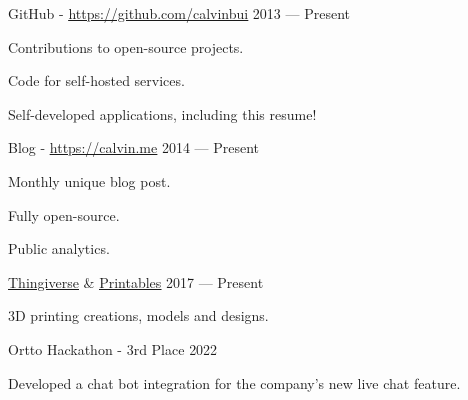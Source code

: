 
\begin{extracurricular}

  \ecitem
  {GitHub - \underline{\href{https://github.com/calvinbui}{https://github.com/calvinbui}}} %
  {2013 --- Present} %
  {
    \begin{cvitems} %
      \item {Contributions to open-source projects.}
      \item {Code for self-hosted services.}
      \item {Self-developed applications, including this resume!}
    \end{cvitems}
  }

  \ecitem
  {Blog - \underline{\href{https://calvin.me}{https://calvin.me}}} %
  {2014 --- Present} %
  {
    \begin{cvitems} %
      \item {Monthly unique blog post.}
      \item {Fully open-source.}
      \item {Public analytics.}
    \end{cvitems}
  }

  \ecitem
  {\underline{\href{https://www.thingiverse.com/calvinbui/designs}{Thingiverse}} \& {\underline{\href{https://www.printables.com/@calvinbui_535631}{Printables}}}} %
  {2017 --- Present} %
  {
    \begin{cvitems} %
      \item {3D printing creations, models and designs.}
    \end{cvitems}
  }
  
  \ecitem
  {Ortto Hackathon - 3rd Place} %
  {2022} %
  {
    \begin{cvitems} %
      \item {Developed a chat bot integration for the company's new live chat feature.}
    \end{cvitems}
  }


\end{extracurricular}
